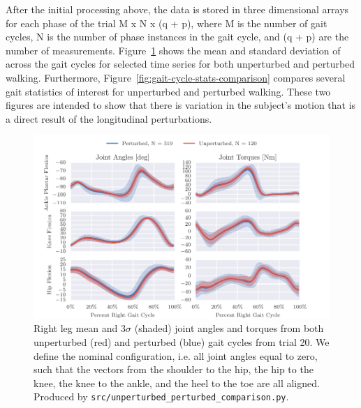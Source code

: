 \documentclass{article}
\begin{document}
After the initial processing above, the data is stored in three dimensional
arrays for each phase of the trial M x N x (q + p), where M is the number of
gait cycles, N is the number of phase instances in the gait cycle, and (q + p)
are the number of measurements. Figure~\ref{fig:angle-torque-comparison} shows
the mean and standard deviation of across the gait cycles for selected time
series for both unperturbed and perturbed walking. Furthermore,
Figure~\ref{fig:gait-cycle-stats-comparison} compares several gait statistics
of interest for unperturbed and perturbed walking. These two figures are
intended to show that there is variation in the subject's motion that is a
direct result of the longitudinal perturbations.
%
\begin{figure}
  \centering
  \includegraphics{figures/unperturbed-perturbed-comparison.pdf}
  \cprotect\caption{Right leg mean and $3\sigma$ (shaded) joint angles and
    torques from both unperturbed (red) and perturbed (blue) gait cycles
    from trial 20. We define the nominal configuration, i.e. all joint angles
    equal to zero, such that the vectors from the shoulder to the hip, the hip
    to the knee, the knee to the ankle, and the heel to the toe are all aligned.
    Produced by \verb|src/unperturbed_perturbed_comparison.py|.}
  \label{fig:angle-torque-comparison}
\end{figure}
%
\end{document}
